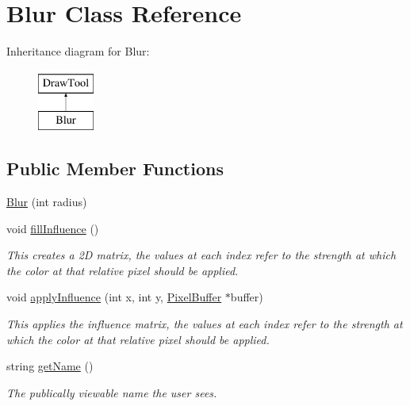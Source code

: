 \hypertarget{classBlur}{}\section{Blur Class Reference}
\label{classBlur}
Inheritance diagram for Blur\+:\begin{figure}[H]
\begin{center}
\leavevmode
\includegraphics[height=2.000000cm]{classBlur}
\end{center}
\end{figure}
\subsection*{Public Member Functions}
\begin{DoxyCompactItemize}
\item 
\hyperlink{classBlur_a4cf976a139e3745e022c6b4fb7b18efb}{Blur} (int radius)
\item 
void \hyperlink{classBlur_a6db41e9d70814abd7d188eee08779c7a}{fill\+Influence} ()\hypertarget{classBlur_a6db41e9d70814abd7d188eee08779c7a}{}\label{classBlur_a6db41e9d70814abd7d188eee08779c7a}

\begin{DoxyCompactList}\small\item\em This creates a 2D matrix, the values at each index refer to the strength at which the color at that relative pixel should be applied. \end{DoxyCompactList}\item 
void \hyperlink{classBlur_a74a6e5acef4b46edc5c79e909296ff53}{apply\+Influence} (int x, int y, \hyperlink{classPixelBuffer}{Pixel\+Buffer} $\ast$buffer)\hypertarget{classBlur_a74a6e5acef4b46edc5c79e909296ff53}{}\label{classBlur_a74a6e5acef4b46edc5c79e909296ff53}

\begin{DoxyCompactList}\small\item\em This applies the influence matrix, the values at each index refer to the strength at which the color at that relative pixel should be applied. \end{DoxyCompactList}\item 
string \hyperlink{classBlur_ad04ff612443d12024ae057ae757e6271}{get\+Name} ()\hypertarget{classBlur_ad04ff612443d12024ae057ae757e6271}{}\label{classBlur_ad04ff612443d12024ae057ae757e6271}

\begin{DoxyCompactList}\small\item\em The publically viewable name the user sees. \end{DoxyCompactList}\end{DoxyCompactItemize}
